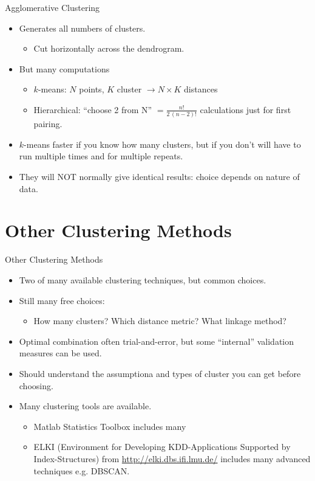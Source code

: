 \documentclass{beamer}
\begin{document}
\begin{frame}{Agglomerative Clustering}
  \begin{itemize}
    \item Generates all numbers of clusters. 
      \begin{itemize}
        \item Cut horizontally across the dendrogram.
      \end{itemize}
    \item But many computations
      \begin{itemize}
        \item $k$-means: $N$ points, $K$ cluster $\rightarrow N\times K$ distances
        \item Hierarchical: ``choose 2 from N'' $=\frac{n!}{2\,(n-2)!}$ calculations just for first pairing.
      \end{itemize}
    \item $k$-means faster if you know how many clusters, but if you don't will have to run multiple times and for multiple repeats.
    \item They will NOT normally give identical results: choice depends on nature of data.
  \end{itemize}
\end{frame}

\section{Other Clustering Methods}
\begin{frame}{Other Clustering Methods}
  \begin{itemize}
    \item Two of many available clustering techniques, but common choices.
    \item Still many free choices:
    \begin{itemize}
      \item How many clusters? Which distance metric? What linkage method?
    \end{itemize}
    \item Optimal combination often trial-and-error, but some ``internal'' validation measures can be used.
    \item Should understand the assumptiona and types of cluster you can get before choosing.
    \item Many clustering tools are available.
    \begin{itemize}
      \item Matlab Statistics Toolbox includes many
      \item ELKI (Environment for Developing KDD-Applications Supported by Index-Structures) from \url{http://elki.dbs.ifi.lmu.de/} includes many advanced techniques e.g. DBSCAN\citep{ester1996density}.
    \end{itemize}
  \end{itemize}
  {\tiny
    
    
  }
\end{frame}
\end{document}
